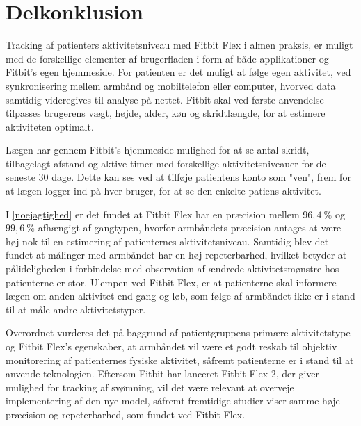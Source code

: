 \section{Delkonklusion}

Tracking af patienters aktivitetsniveau med Fitbit Flex i almen praksis, er muligt med de forskellige elementer af brugerfladen i form af både applikationer og Fitbit's egen hjemmeside. For patienten er det muligt at følge egen aktivitet, ved synkronisering mellem armbånd og mobiltelefon eller computer, hvorved data samtidig videregives til analyse på nettet. Fitbit skal ved første anvendelse tilpasses brugerens vægt, højde, alder, køn og skridtlængde, for at estimere aktiviteten optimalt.

Lægen har gennem Fitbit's hjemmeside mulighed for at se antal skridt, tilbagelagt afstand og aktive timer med forskellige aktivitetsniveauer for de seneste $30$ dage. Dette kan ses ved at tilføje patientens konto som "ven", frem for at lægen logger ind på hver bruger, for at se den enkelte patiens aktivitet. 

I \ref{noejagtighed} er det fundet at Fitbit Flex har en præcision mellem $96,4~\%$ og $99,6~\%$ afhængigt af gangtypen, hvorfor armbåndets præcision antages at være høj nok til en estimering af patienternes aktivitetsniveau. Samtidig blev det fundet at målinger med armbåndet har en høj repeterbarhed, hvilket betyder at pålideligheden i forbindelse med observation af ændrede aktivitetsmønstre hos patienterne er stor. Ulempen ved Fitbit Flex, er at patienterne skal informere lægen om anden aktivitet end gang og løb, som følge af armbåndet ikke er i stand til at måle andre aktivitetstyper.

Overordnet vurderes det på baggrund af patientgruppens primære aktivitetstype og Fitbit Flex's egenskaber, at armbåndet vil være et godt reskab til objektiv monitorering af patienternes fysiske aktivitet, såfremt patienterne er i stand til at anvende teknologien. Eftersom Fitbit har lanceret Fitbit Flex 2, der giver mulighed for tracking af svømning, vil det være relevant at overveje implementering af den nye model, såfremt fremtidige studier viser samme høje præcision og repeterbarhed, som fundet ved Fitbit Flex.